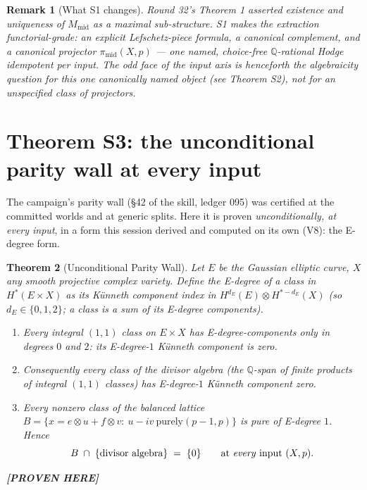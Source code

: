 \documentclass[11pt]{article}
\newtheorem{theorem}{Theorem}
\newtheorem{remark}[theorem]{Remark}
\newcommand{\PROVEN}{\textbf{[PROVEN HERE]}}
\newcommand{\Q}{\mathbb{Q}}
\begin{document}
\begin{remark}[What S1 changes]
Round 32's Theorem 1 asserted existence and uniqueness of
$M_{\mathrm{mid}}$ as a maximal sub-\emph{structure}. S1 makes the extraction
\emph{functorial-grade}: an explicit Lefschetz-piece formula, a canonical
complement, and a canonical projector $\pi_{\mathrm{mid}}(X,p)$ --- one
named, choice-free $\Q$-rational Hodge idempotent per input. The odd face of
the input axis is henceforth the algebraicity question for this one canonically
named object (see Theorem S2), not for an unspecified class of projectors.
\end{remark}

\section{Theorem S3: the unconditional parity wall at every input}

The campaign's parity wall (\S42 of the skill, ledger 095) was certified at
the committed worlds and at generic splits. Here it is proven
\emph{unconditionally, at every input}, in a form this session derived and
computed on its own (V8): the E-degree form.

\begin{theorem}[Unconditional Parity Wall]\label{thm:s3}
Let $E$ be the Gaussian elliptic curve, $X$ any smooth projective complex
variety. Define the \emph{E-degree} of a class in
$H^{*}(E\times X)$ as its Künneth component index in
$H^{d_E}(E)\otimes H^{*-d_E}(X)$ (so $d_E\in\{0,1,2\}$; a class is a sum of
its E-degree components).
\begin{enumerate}[label=(\roman*)]
\item Every integral $(1,1)$ class on $E\times X$ has E-degree-components
only in degrees $0$ and $2$: its E-degree-$1$ Künneth component is zero.
\item Consequently every class of the divisor algebra (the
$\Q$-span of finite products of integral $(1,1)$ classes) has
E-degree-$1$ Künneth component zero.
\item Every nonzero class of the balanced lattice
$B=\{x=e\otimes u+f\otimes v:\ u-iv\ \text{purely}(p-1,p)\}$
is pure of E-degree $1$. Hence
\[
B\;\cap\;\{\text{divisor algebra}\}\;=\;\{0\}
\qquad\text{at \emph{every} input }(X,p).
\]
\end{enumerate}
\PROVEN{}
\end{theorem}
\end{document}
